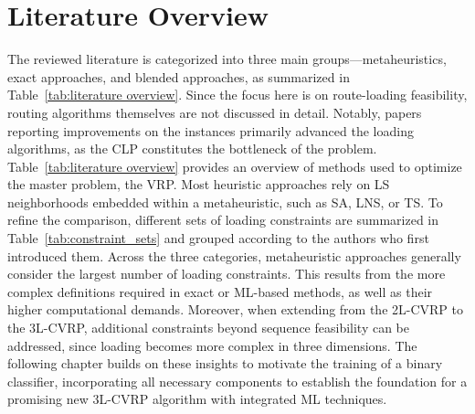 \section{Literature Overview}
\label{sec:literature_overview}
The reviewed literature is categorized into three main groups—metaheuristics, exact approaches, and blended approaches, as
summarized in Table~\ref{tab:literature overview}. Since the focus here is on route-loading feasibility, routing algorithms
themselves are not discussed in detail. Notably, papers reporting improvements on the \gendreauDataSetText instances primarily
advanced the loading algorithms, as the \gls{CLP} constitutes the bottleneck of the problem.
Table~\ref{tab:literature overview} provides an overview of methods used to optimize the master problem, the \gls{VRP}.
Most heuristic approaches rely on \gls{LS} neighborhoods embedded within a metaheuristic, such as \gls{SA}, \gls{LNS},
or \gls{TS}. To refine the comparison, different sets of loading constraints are summarized in Table~\ref{tab:constraint_sets}
and grouped according to the authors who first introduced them.
Across the three categories, metaheuristic approaches generally consider the largest number of loading constraints. This results
from the more complex definitions required in exact or \gls{ML}-based methods, as well as their higher computational demands.
Moreover, when extending from the \gls{2L-CVRP} to the \gls{3L-CVRP}, additional constraints beyond sequence feasibility can
be addressed, since loading becomes more complex in three dimensions.
The following chapter builds on these insights to motivate the training of a binary classifier, incorporating all necessary
components to establish the foundation for a promising new \gls{3L-CVRP} algorithm with integrated \gls{ML} techniques.

